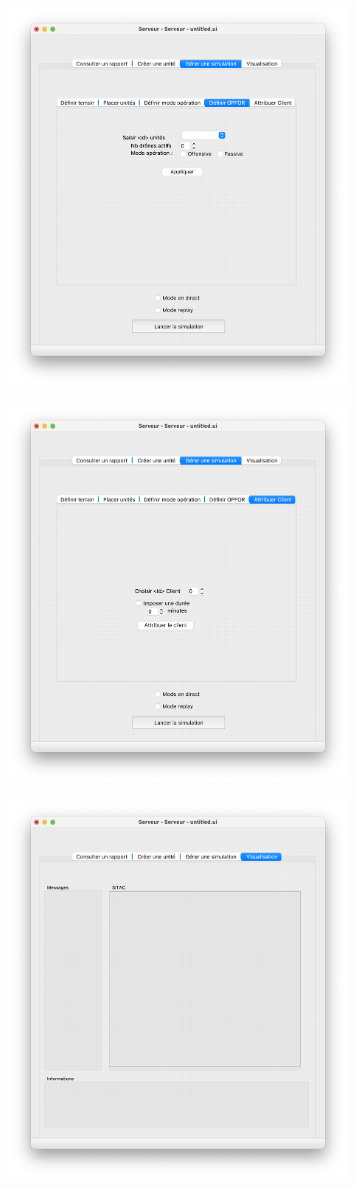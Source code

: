 \documentclass[12pt,a4paper]{scrartcl}
\theoremstyle{plain}
\theoremstyle{definition}
\theoremstyle{remark}
\begin{document}
		\begin{figure}[H]
		\centering
		\includegraphics[height=10cm]{img/maquette/serveur/6.png} 
	\end{figure}
		\begin{figure}[H]
		\centering
		\includegraphics[height=10cm]{img/maquette/serveur/7.png} 
	\end{figure}
		\begin{figure}[H]
		\centering
		\includegraphics[height=10cm]{img/maquette/serveur/8.png} 
	\end{figure}
	
\end{document}
